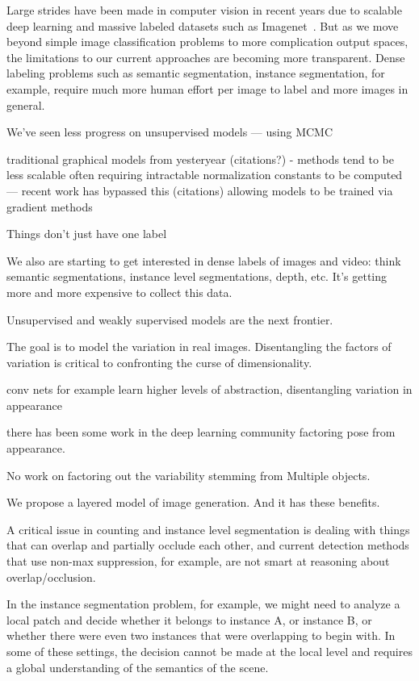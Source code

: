 

Large strides have been made in computer vision in recent years 
due to scalable deep learning and massive labeled datasets such as Imagenet~\cite{krizhevsky2012imagenet,deng2009imagenet}.
But as we move beyond simple image classification problems to more complication output spaces, the limitations
to our current approaches are becoming more transparent.
Dense labeling problems such as semantic segmentation, instance segmentation, for example,
require much more human effort per image to label and more images in general.




We've seen less progress on unsupervised models  ---  using MCMC

traditional graphical models from yesteryear (citations?) 	- methods tend to be less scalable often requiring intractable normalization constants to be computed
  --- recent work has bypassed this (citations) allowing models to be trained via gradient methods


Things don't just have one label

We also are starting to get interested in dense labels of images and video: think semantic segmentations, instance level segmentations, depth, etc.
	It's getting more and more expensive to collect this data.

	
Unsupervised and weakly supervised models are the next frontier.  

The goal is to model the variation in real images.  
Disentangling the factors of variation is critical to confronting the curse of dimensionality.

conv nets for example learn higher levels of abstraction, disentangling variation in appearance

there has been some work in the deep learning community factoring pose from appearance.

No work on factoring out the variability stemming from Multiple objects.

We propose a layered model of image generation.  And it has these benefits.




A critical issue in counting and instance level segmentation is dealing with things that can overlap and partially occlude each other, and current detection methods that use non-max suppression, for example, are not smart at reasoning about overlap/occlusion.  

In the instance segmentation problem, for example, we might need to analyze a local patch and decide whether it belongs to instance A, or instance B, or whether there were even two instances that were overlapping to begin with.  In some of these settings, the decision cannot be made at the local level and requires a global understanding of the semantics of the scene.


